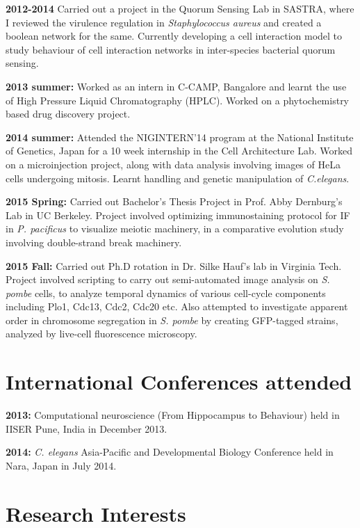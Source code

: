 \documentclass{res}
\begin{document}
\begin{resume}
{\bf 2012-2014} Carried out a project in the Quorum Sensing Lab in SASTRA, where I reviewed the virulence regulation in {\it Staphylococcus aureus} and created a boolean network for the same. Currently developing a cell interaction model to study behaviour of cell interaction networks in inter-species bacterial quorum sensing.

{\bf 2013 summer:} Worked as an intern in C-CAMP, Bangalore and learnt the use of High Pressure Liquid Chromatography (HPLC). Worked on a phytochemistry based drug discovery project.

{\bf 2014 summer:} Attended the NIGINTERN'14 program at the National Institute of Genetics, Japan for a 10 week internship in the Cell Architecture Lab. Worked on a microinjection project, along with data analysis involving images of HeLa cells undergoing mitosis. Learnt handling and genetic manipulation of {\it C.elegans}. 

{\bf 2015 Spring:} Carried out Bachelor's Thesis Project in Prof. Abby Dernburg's Lab in UC Berkeley. Project involved optimizing immunostaining protocol for IF in {\it P. pacificus} to visualize meiotic machinery, in a comparative evolution study involving double-strand break machinery. 

{\bf 2015 Fall:} Carried out Ph.D rotation in Dr. Silke Hauf's lab in Virginia Tech. Project involved scripting to carry out semi-automated image analysis on {\it S. pombe} cells, to analyze temporal dynamics of various cell-cycle components including Plo1, Cdc13, Cdc2, Cdc20 etc. Also attempted to investigate apparent order in chromosome segregation in {\it S. pombe} by creating GFP-tagged strains, analyzed by live-cell fluorescence microscopy. 

\section{International Conferences attended}
\vspace{0.1in}

{\bf 2013:} Computational neuroscience (From Hippocampus to Behaviour) held in IISER Pune, India in December 2013.

{\bf 2014:} {\it C. elegans} Asia-Pacific and Developmental Biology Conference held in Nara, Japan in July 2014.   

\pagebreak
\section{Research Interests}
\vspace{0.1in}


\end{resume}
\end{document}
